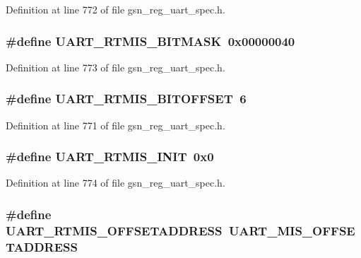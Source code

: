 Definition at line 772 of file gsn\_\-reg\_\-uart\_\-spec.h.

\hypertarget{a00575_a2f0ced95690044a3d39f1b79ad403982}{
\subsubsection[{UART\_\-RTMIS\_\-BITMASK}]{\setlength{\rightskip}{0pt plus 5cm}\#define UART\_\-RTMIS\_\-BITMASK~0x00000040}}
\label{a00575_a2f0ced95690044a3d39f1b79ad403982}


Definition at line 773 of file gsn\_\-reg\_\-uart\_\-spec.h.

\hypertarget{a00575_a884eccca3ddb6433f85a2782a62230f3}{
\subsubsection[{UART\_\-RTMIS\_\-BITOFFSET}]{\setlength{\rightskip}{0pt plus 5cm}\#define UART\_\-RTMIS\_\-BITOFFSET~6}}
\label{a00575_a884eccca3ddb6433f85a2782a62230f3}


Definition at line 771 of file gsn\_\-reg\_\-uart\_\-spec.h.

\hypertarget{a00575_ac0c2e1816dae96835d2ebdb7be3e4ff6}{
\subsubsection[{UART\_\-RTMIS\_\-INIT}]{\setlength{\rightskip}{0pt plus 5cm}\#define UART\_\-RTMIS\_\-INIT~0x0}}
\label{a00575_ac0c2e1816dae96835d2ebdb7be3e4ff6}


Definition at line 774 of file gsn\_\-reg\_\-uart\_\-spec.h.

\hypertarget{a00575_a00d3717497e5d21385bda08216e7636f}{
\subsubsection[{UART\_\-RTMIS\_\-OFFSETADDRESS}]{\setlength{\rightskip}{0pt plus 5cm}\#define UART\_\-RTMIS\_\-OFFSETADDRESS~UART\_\-MIS\_\-OFFSETADDRESS}}
\label{a00575_a00d3717497e5d21385bda08216e7636f}


